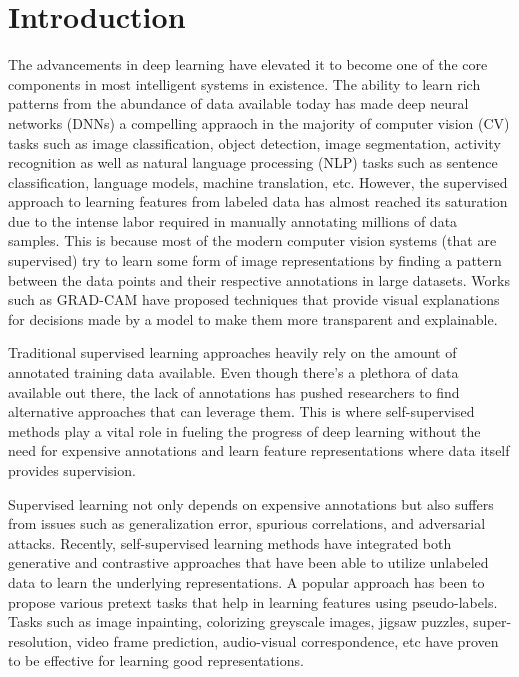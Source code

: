 \documentclass[conference]{IEEEtran}
\begin{document}
\section{Introduction}
The advancements in deep learning \cite{b1} have elevated it to become one of the core components in most intelligent systems in existence.
The ability to learn rich patterns from the abundance of data available today has made deep neural networks (DNNs) a compelling appraoch in the majority of computer vision (CV) tasks such as image classification, object detection, image segmentation, activity recognition as well as natural language processing (NLP) tasks such as sentence classification,
language models, machine translation, etc. However, the supervised approach to learning features from labeled data has almost reached its saturation due to the intense labor required in manually annotating millions of data samples.
This is because most of the modern computer vision systems (that are supervised) try to learn some form of image representations by finding a pattern between the data points and their respective annotations in large datasets.
Works such as GRAD-CAM have proposed techniques that provide visual explanations for decisions made by a model to make them more transparent and explainable.

Traditional supervised learning approaches heavily rely on the amount of annotated training data available. Even though there's 
a plethora of data available out there, the lack of annotations has pushed researchers to find alternative approaches that can leverage them.
This is where self-supervised methods play a vital role in fueling the progress of deep learning without the need for expensive annotations and learn feature representations where data itself provides supervision.

Supervised learning not only depends on expensive annotations but also suffers from issues such as generalization error, spurious correlations, and adversarial attacks.
Recently, self-supervised learning methods have integrated both generative and contrastive approaches that have been able to utilize unlabeled data to learn the underlying representations.
A popular approach has been to propose various pretext tasks that help in learning features using pseudo-labels. 
Tasks such as image inpainting, colorizing greyscale images, jigsaw puzzles, super-resolution, video frame prediction, audio-visual correspondence, etc have proven to be effective for learning good representations.
\end{document}
